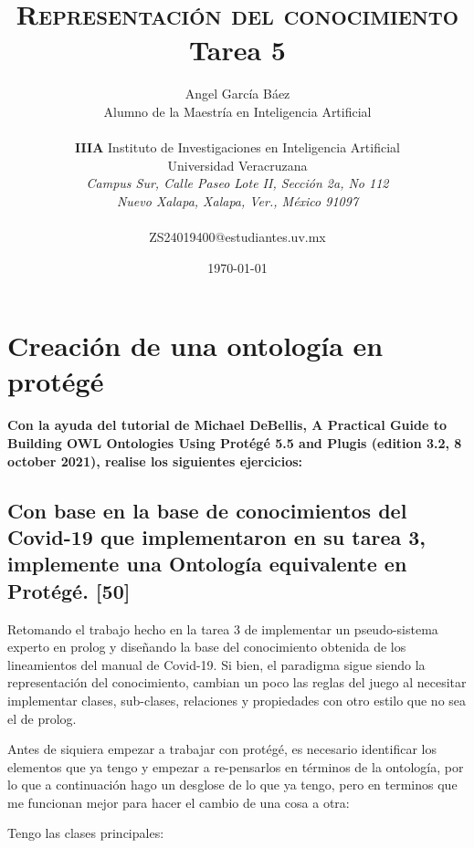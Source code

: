 \documentclass[11pt, letterpaper]{article}
\title{\textsc{Representación del conocimiento} \\
	Tarea 5
}
\author{Angel García Báez\\
	Alumno de la Maestría en Inteligencia Artificial \\ \\ \textbf{IIIA}
	Instituto de Investigaciones en Inteligencia Artificial \\
	Universidad Veracruzana \\ \emph{Campus Sur, Calle Paseo Lote II,
		Sección 2a, No 112} \\ \emph{Nuevo Xalapa, Xalapa, Ver., México 91097}
	\\ \\ ZS24019400@estudiantes.uv.mx}
\date{\today}
\begin{document}
	
\maketitle

\newpage
	
\section{Creación de una ontología en protégé}
	
\textbf{Con la ayuda del tutorial de Michael DeBellis, A Practical Guide to Building
	OWL Ontologies Using Protégé 5.5 and Plugis (edition 3.2, 8 october 2021),
	realise los siguientes ejercicios:}
		
	

\subsection{Con base en la base de conocimientos del Covid-19 que implementaron en su tarea 3, implemente una Ontología equivalente en Protégé. [50]}

Retomando el trabajo hecho en la tarea 3 de implementar un pseudo-sistema experto en prolog y diseñando la base del conocimiento obtenida de los lineamientos del manual de Covid-19. Si bien, el paradigma sigue siendo la representación del conocimiento, cambian un poco las reglas del juego al necesitar implementar clases, sub-clases, relaciones y propiedades con  otro estilo que no sea el de prolog. 

Antes de siquiera empezar a trabajar con protégé, es necesario identificar los elementos que ya tengo y empezar a re-pensarlos en términos de la ontología, por lo que  a continuación hago un desglose de lo que ya tengo, pero en terminos que me funcionan mejor para hacer el cambio de una cosa a otra:

Tengo las clases principales:
\end{document}
